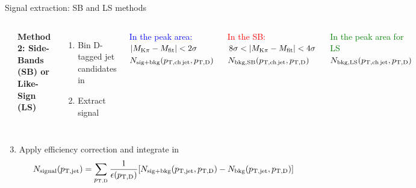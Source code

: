 \documentclass{beamer}
\begin{document}
\begin{frame}{Signal extraction: SB and LS methods}
\begin{columns}

\includegraphics[width=\textwidth]{img/HQ16_Simulation_InvMassSB}

\textbf{\alert{Method 2: Side-Bands (SB) or Like-Sign (LS)}}
\begin{enumerate}
\item Bin D-tagged jet candidates in \ptd
\item Extract signal
\end{enumerate}

\textcolor{blue}{In the peak area: $|M_{\rm K\pi} - M_{\rm fit}| <2\sigma$\\ $N_{\rm sig+bkg} (p_{\mathrm{T,ch\, jet}}, p_{\mathrm{T,D}})$}

\textcolor{red}{In the SB: $8\sigma <|M_{\rm K\pi} - M_{\rm fit}| < 4\sigma$\\ $N_{\rm bkg, SB} (p_{\mathrm{T,ch\, jet}}, p_{\mathrm{T,D}})$}

\textcolor{green}{In the peak area for LS \\ $N_{\rm bkg, LS} (p_{\mathrm{T,ch\, jet}}, p_{\mathrm{T,D}})$}

\end{columns}
\begin{enumerate}
\setcounter{enumi}{2}
\item Apply efficiency correction and integrate in \ptd
$$N_{\rm signal} (p_{\mathrm{T,jet}})=\sum_{p_{\mathrm{T,D}}} \frac{1}{\epsilon(p_{\mathrm{T,D}})} [N_{\rm sig+bkg}(p_{\mathrm{T,jet}}, p_{\mathrm{T,D}}) - N_{\rm bkg}(p_{\mathrm{T,jet}}, p_{\mathrm{T,D}})]$$
\end{enumerate}
\end{frame}
\end{document}
